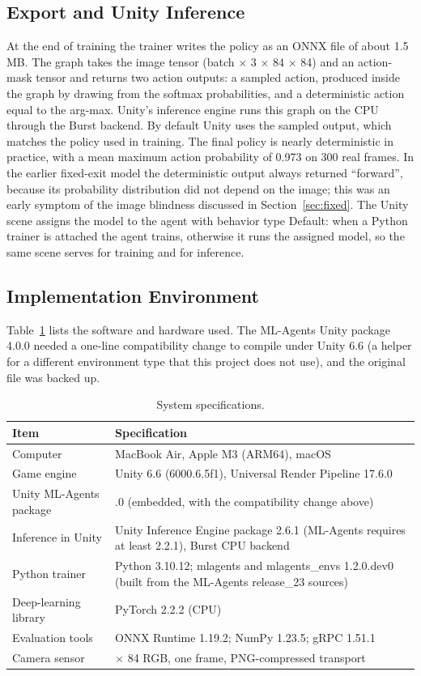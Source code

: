 \documentclass[conference]{IEEEtran}
\begin{document}
\subsection{Export and Unity Inference}
At the end of training the trainer writes the policy as an ONNX file of about 1.5 MB. The graph takes the image tensor (batch $\times$ 3 $\times$ 84 $\times$ 84) and an action-mask tensor and returns two action outputs: a sampled action, produced inside the graph by drawing from the softmax probabilities, and a deterministic action equal to the arg-max. Unity's inference engine runs this graph on the CPU through the Burst backend. By default Unity uses the sampled output, which matches the policy used in training. The final policy is nearly deterministic in practice, with a mean maximum action probability of 0.973 on 300 real frames. In the earlier fixed-exit model the deterministic output always returned ``forward'', because its probability distribution did not depend on the image; this was an early symptom of the image blindness discussed in Section~\ref{sec:fixed}. The Unity scene assigns the model to the agent with behavior type Default: when a Python trainer is attached the agent trains, otherwise it runs the assigned model, so the same scene serves for training and for inference.


\subsection{Implementation Environment}
Table~\ref{tab:specs} lists the software and hardware used. The ML-Agents Unity package 4.0.0 needed a one-line compatibility change to compile under Unity 6.6 (a helper for a different environment type that this project does not use), and the original file was backed up.

\begin{table}[!t]
\caption{System specifications.}
\label{tab:specs}
\centering\footnotesize\renewcommand{\arraystretch}{1.12}
\begin{tabular}{@{}>{\raggedright\arraybackslash}p{3.0cm}>{\raggedright\arraybackslash}p{4.2cm}@{}}
\toprule
Item & Specification \\ \midrule
Computer & MacBook Air, Apple M3 (ARM64), macOS \\
Game engine & Unity 6.6 (6000.6.5f1), Universal Render Pipeline 17.6.0 \\
Unity ML-Agents package & 4.0.0 (embedded, with the compatibility change above) \\
Inference in Unity & Unity Inference Engine package 2.6.1 (ML-Agents requires at least 2.2.1), Burst CPU backend \\
Python trainer & Python 3.10.12; mlagents and mlagents\_envs 1.2.0.dev0 (built from the ML-Agents release\_23 sources) \\
Deep-learning library & PyTorch 2.2.2 (CPU) \\
Evaluation tools & ONNX Runtime 1.19.2; NumPy 1.23.5; gRPC 1.51.1 \\
Camera sensor & 84 $\times$ 84 RGB, one frame, PNG-compressed transport \\
\bottomrule
\end{tabular}
\end{table}
\end{document}
